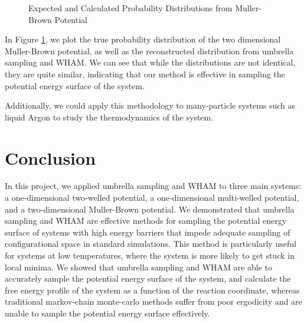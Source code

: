 \documentclass{article}
\begin{document}
\begin{figure}[h]%
    \centering
    \qquad
    \caption{Expected and Calculated Probability Distributions from Muller-Brown Potential}%
    \label{fig:2d_results}%
\end{figure}

In Figure \ref{fig:2d_results}, we plot the true probability distribution of the two dimensional Muller-Brown potential, as well as the reconstructed distribution from umbrella sampling and WHAM. We can see that while the distributions are not identical, they are quite similar, indicating that our method is effective in sampling the potential energy surface of the system.

Additionally, we could apply this methodology to many-particle systems such as liquid Argon to study the thermodynamics of the system. 

\section{Conclusion}

In this project, we applied umbrella sampling and WHAM to three main systems: a one-dimensional two-welled potential, a one-dimensional multi-welled potential, and a two-dimensional Muller-Brown potential. We demonstrated that umbrella sampling and WHAM are effective methods for sampling the potential energy surface of systems with high energy barriers that impede adequate sampling of configurational space in standard simulations. This method is particularly useful for systems at low temperatures, where the system is more likely to get stuck in local minima. We showed that umbrella sampling and WHAM are able to accurately sample the potential energy surface of the system, and calculate the free energy profile of the system as a function of the reaction coordinate, whereas traditional markov-chain monte-carlo methods suffer from poor ergodicity and are unable to sample the potential energy surface effectively.
\end{document}
